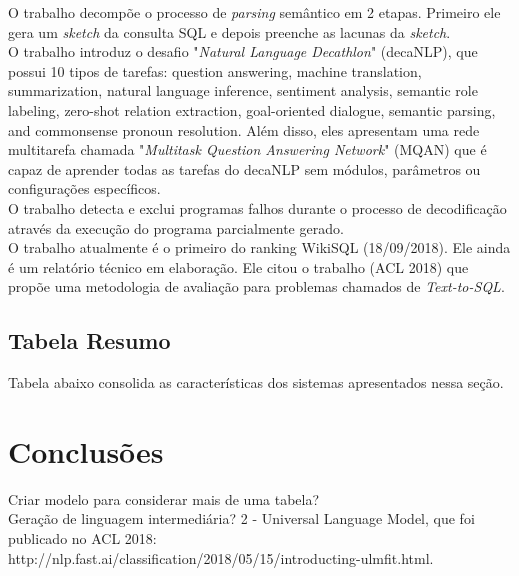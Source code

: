 \documentclass{article}
\begin{document}
O trabalho \citep{dong2018coarse} decompõe o processo de \textit{parsing} semântico em 2 etapas. Primeiro ele gera um \textit{sketch} da consulta SQL e depois preenche as lacunas da \textit{sketch}. \\

O trabalho \cite{mccann2018natural} introduz o desafio "\textit{Natural Language Decathlon}" (decaNLP), que possui 10 tipos de tarefas: question answering, machine translation, summarization, natural language inference, sentiment analysis, semantic role labeling, zero-shot relation extraction, goal-oriented dialogue, semantic parsing, and commonsense pronoun resolution. Além disso, eles apresentam uma rede multitarefa chamada "\textit{Multitask Question Answering Network}" (MQAN) que é capaz de aprender todas as tarefas do decaNLP sem módulos, parâmetros ou configurações específicos. \\

O trabalho \citep{2018arXiv180703100W} detecta e exclui programas falhos durante o processo de decodificação através da execução do programa parcialmente gerado. \\

O trabalho \citep{shi2018incsql} atualmente é o primeiro do ranking WikiSQL (18/09/2018). Ele ainda é um relatório técnico em elaboração. Ele citou o trabalho \citep{finegan2018improving} (ACL 2018) que propõe uma metodologia de avaliação para problemas chamados de \textit{Text-to-SQL}.\\

\subsection{Tabela Resumo}

Tabela abaixo consolida as características dos sistemas apresentados nessa seção.


\section{Conclusões\label{conclusoes}}

Criar modelo para considerar mais de uma tabela?\\

Geração de linguagem intermediária? 2 - Universal Language Model, que foi publicado no ACL 2018: http://nlp.fast.ai/classification/2018/05/15/introducting-ulmfit.html.\\
\end{document}

